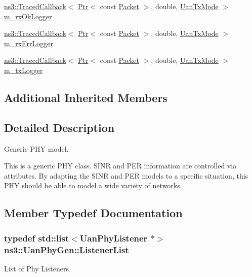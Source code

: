 \begin{DoxyCompactItemize}
\item 
\hyperlink{classns3_1_1TracedCallback}{ns3\+::\+Traced\+Callback}$<$ \hyperlink{classns3_1_1Ptr}{Ptr}$<$ const \hyperlink{classns3_1_1Packet}{Packet} $>$, double, \hyperlink{classns3_1_1UanTxMode}{Uan\+Tx\+Mode} $>$ \hyperlink{classns3_1_1UanPhyGen_a151fedae9333b5fdfa5a88ae2fb459d4}{m\+\_\+rx\+Ok\+Logger}
\item 
\hyperlink{classns3_1_1TracedCallback}{ns3\+::\+Traced\+Callback}$<$ \hyperlink{classns3_1_1Ptr}{Ptr}$<$ const \hyperlink{classns3_1_1Packet}{Packet} $>$, double, \hyperlink{classns3_1_1UanTxMode}{Uan\+Tx\+Mode} $>$ \hyperlink{classns3_1_1UanPhyGen_a31e8c081996ccafe5a8f6ceeaddd7542}{m\+\_\+rx\+Err\+Logger}
\item 
\hyperlink{classns3_1_1TracedCallback}{ns3\+::\+Traced\+Callback}$<$ \hyperlink{classns3_1_1Ptr}{Ptr}$<$ const \hyperlink{classns3_1_1Packet}{Packet} $>$, double, \hyperlink{classns3_1_1UanTxMode}{Uan\+Tx\+Mode} $>$ \hyperlink{classns3_1_1UanPhyGen_a18fa0133aac0f1187120ab09243b25e3}{m\+\_\+tx\+Logger}
\end{DoxyCompactItemize}
\subsection*{Additional Inherited Members}


\subsection{Detailed Description}
Generic P\+HY model.

This is a generic P\+HY class. S\+I\+NR and P\+ER information are controlled via attributes. By adapting the S\+I\+NR and P\+ER models to a specific situation, this P\+HY should be able to model a wide variety of networks. 

\subsection{Member Typedef Documentation}
\subsubsection[{\texorpdfstring{Listener\+List}{ListenerList}}]{\setlength{\rightskip}{0pt plus 5cm}typedef {\bf std\+::list}$<${\bf Uan\+Phy\+Listener} $\ast$$>$ {\bf ns3\+::\+Uan\+Phy\+Gen\+::\+Listener\+List}\hspace{0.3cm}{\ttfamily [private]}}\hypertarget{classns3_1_1UanPhyGen_a722a10230697990a82311b46b59f777a}{}\label{classns3_1_1UanPhyGen_a722a10230697990a82311b46b59f777a}
List of Phy Listeners. 


